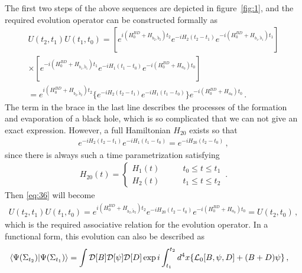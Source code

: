 \documentclass[12pt,a4paper]{article}
\begin{document}
The first two steps of the above sequences are
depicted in figure~\ref{fig:1}, and the required evolution operator can
be constructed formally as
\begin{equation}
\label{eq:36}
\begin{split}
U(t_2,t_1)U(t_1,t_0) = [e^{i(H^{BD}_{0}+H_{b_2,\tilde{b}_2})t_2}e^{-iH_2(t_2-t_1)}e^{-i(H^{BD}_{0}+H_{b_1,\tilde{b}_1})t_1}]\\
\times
[e^{-i(H^{BD}_{0}+H_{b_1,\tilde{b}_1})t_1}e^{-iH_1(t_1-t_0)}e^{-i(H^{BD}_{0}+H_{a_0})t_0}] \\= e^{i(H^{BD}_{0}+H_{b_2,\tilde{b}_2})t_2}\{e^{-iH_2(t_2-t_1)}e^{-iH_1(t_1-t_0)}\}e^{-i(H^{BD}_{0}+H_{a_0})t_0}\,.
\end{split}
\end{equation}
The term in the brace in the last line describes the processes of the formation and evaporation of a black hole, which is so complicated that we can not give an exact expression. However, a full Hamiltonian $H_{20}$ exists so that
\begin{equation}
\label{eq:36a}
\begin{split}
e^{-iH_2(t_2-t_1)}e^{-iH_1(t_1-t_0)}=e^{-iH_{20}(t_2-t_0)}\,,
\end{split}
\end{equation}
since there is always such a time parametrization satisfying
\begin{equation}
\label{eq:36b}
\begin{split}
H_{20}(t) = \left\{ \begin{array}{ll}
H_{1}(t)\qquad & \textrm{$t_0\leq t\leq t_1$}\\
H_{2}(t)\qquad & \textrm{$t_1\leq t\leq t_2$}
\end{array} \right.\,.
\end{split}
\end{equation}
Then \eqref{eq:36} will become
\begin{equation}
\label{eq:36c}
\begin{split}
U(t_2,t_1)U(t_1,t_0)= e^{i(H^{BD}_{0}+H_{b_2,\tilde{b}_2})t_2}e^{-iH_{20}(t_2-t_0)}e^{-i(H^{BD}_{0}+H_{a_0})t_0}=U(t_2,t_0)\,,
\end{split}
\end{equation}
which is the required associative relation for the evolution operator. In a functional form, this evolution can
also be described as
\begin{equation}
\label{eq:37}
\begin{split}
\langle\Psi(\Sigma_{t_2})\arrowvert\Psi(\Sigma_{t_1})\rangle &=
\int\mathcal {D}[B]\mathcal{D}[\psi]\mathcal{D}[D]\exp
 i\int_{t_1}^{t_2} d^4x\{\mathcal {L}_0[B,\psi,D]+(B+D)\psi\} \,,
\end{split}
\end{equation}
\end{document}
